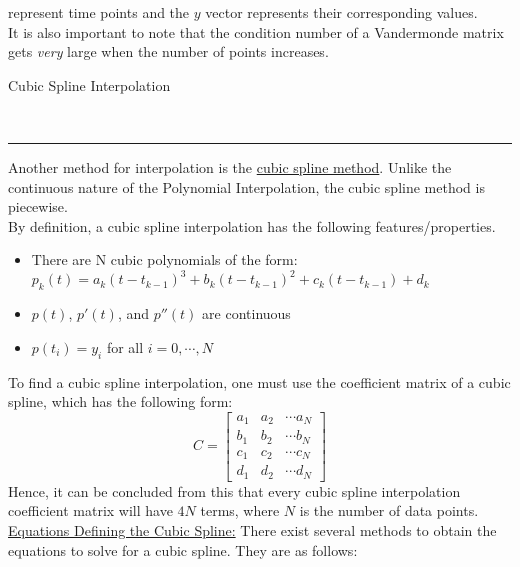 \documentclass{article}
\newcommand{\header}[1]{\begin{large}\noindent #1\end{large}\\\rule{\textwidth}{0.5pt}}
\newcommand{\gap}{\medskip\\}
\begin{document}
represent time points and the $y$ vector represents their corresponding values.
\gap
It is also important to note that the condition number of a Vandermonde matrix gets
\textit{very} large when the number of points increases.
\gap
\header{Cubic Spline Interpolation}
Another method for interpolation is the \underline{cubic spline method}. Unlike the
continuous nature of the Polynomial Interpolation, the cubic spline method is 
piecewise.
\gap
By definition, a cubic spline interpolation has the following features/properties.
\begin{itemize}
    \item There are N cubic polynomials of the form:\\
    $
        p_k(t) = a_k(t - t_{k-1})^3 + b_k(t - t_{k-1})^2 + c_k(t - t_{k - 1}) + d_k    
    $
    \item $p(t)$, $p'(t)$, and $p''(t)$ are continuous
    \item $p(t_i) = y_i$ for all $i = 0, \cdots, N$
\end{itemize}
To find a cubic spline interpolation, one must use the coefficient matrix of a cubic
spline, which has the following form:
\[
    C = \begin{bmatrix}
        a_1 & a_2 & \cdots a_N\\
        b_1 & b_2 & \cdots b_N\\
        c_1 & c_2 & \cdots c_N\\
        d_1 & d_2 & \cdots d_N
    \end{bmatrix}    
\]
Hence, it can be concluded from this that every cubic spline interpolation coefficient
matrix will have $4N$ terms, where $N$ is the number of data points.
\gap
\underline{Equations Defining the Cubic Spline:} There exist several methods to obtain
the equations to solve for a cubic spline. They are as follows:
\end{document}
